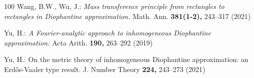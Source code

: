 \documentclass[12pt,a4paper,twoside]{article}
\begin{document}
\begin{thebibliography}{100}
 Wang, B.W.,  Wu, J.:
\textit{Mass transference principle from rectangles to rectangles in Diophantine approximation.}
Math. Ann. {\bf 381(1-2),}  243--317 (2021)




 Yu, H.:
\textit{A Fourier-analytic approach to inhomogeneous Diophantine approximation.}
Acta Arith. {\bf 190,}  263--292 (2019)




Yu, H.:
On the metric theory of inhomogeneous Diophantine approximation: an Erd\H{o}s-Vaaler type result.
J. Number Theory {\bf 224,}  243--273  (2021)




\end{thebibliography}









\end{document}
